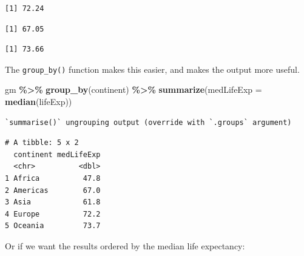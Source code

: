 \documentclass[
]{krantz}
\makeatletter
\newenvironment{Shaded}{\begin{snugshade}}{\end{snugshade}}
\newcommand{\DataTypeTok}[1]{\textcolor[rgb]{0.27,0.27,0.27}{#1}}
\newcommand{\KeywordTok}[1]{\textcolor[rgb]{0.27,0.27,0.27}{\textbf{#1}}}
\newcommand{\NormalTok}[1]{#1}
\newcommand{\OperatorTok}[1]{\textcolor[rgb]{0.43,0.43,0.43}{\textbf{#1}}}
\newcommand{\StringTok}[1]{\textcolor[rgb]{0.5,0.5,0.5}{#1}}
\newenvironment{kframe}{%
\medskip{}
\setlength{\fboxsep}{.8em}
 \def\at@end@of@kframe{}%
 \ifinner\ifhmode%
  \def\at@end@of@kframe{\end{minipage}}%
  \begin{minipage}{\columnwidth}%
 \fi\fi%
 \def\FrameCommand##1{\hskip\@totalleftmargin \hskip-\fboxsep
 \colorbox{shadecolor}{##1}\hskip-\fboxsep
     \hskip-\linewidth \hskip-\@totalleftmargin \hskip\columnwidth}%
 \MakeFramed {\advance\hsize-\width
   \@totalleftmargin\z@ \linewidth\hsize
   \@setminipage}}%
 {\par\unskip\endMakeFramed%
 \at@end@of@kframe}
\renewenvironment{Shaded}{\begin{kframe}}{\end{kframe}}
\makeatother
\begin{document}
\begin{verbatim}
[1] 72.24
\end{verbatim}

\begin{Shaded}
\end{Shaded}

\begin{verbatim}
[1] 67.05
\end{verbatim}

\begin{Shaded}
\end{Shaded}

\begin{verbatim}
[1] 73.66
\end{verbatim}

The \texttt{group\_by()} function makes this easier, and makes the output more useful.

\begin{Shaded}
\begin{Highlighting}[]
\NormalTok{gm }\OperatorTok{\%\textgreater{}\%}\StringTok{ }
\StringTok{  }\KeywordTok{group\_by}\NormalTok{(continent) }\OperatorTok{\%\textgreater{}\%}\StringTok{ }
\StringTok{  }\KeywordTok{summarize}\NormalTok{(}\DataTypeTok{medLifeExp =} \KeywordTok{median}\NormalTok{(lifeExp)) }
\end{Highlighting}
\end{Shaded}

\begin{verbatim}
`summarise()` ungrouping output (override with `.groups` argument)
\end{verbatim}

\begin{verbatim}
# A tibble: 5 x 2
  continent medLifeExp
  <chr>          <dbl>
1 Africa          47.8
2 Americas        67.0
3 Asia            61.8
4 Europe          72.2
5 Oceania         73.7
\end{verbatim}

Or if we want the results ordered by the median life expectancy:
\end{document}
